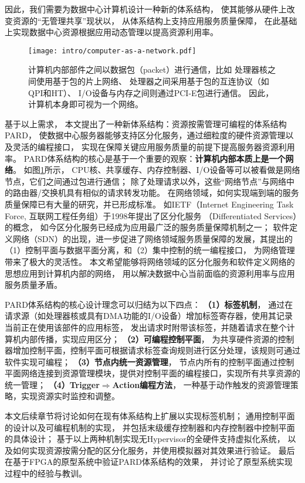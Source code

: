 因此，我们需要为数据中心计算机设计一种新的体系结构，
使其能够从硬件上改变资源的``无管理共享''现状以，
从体系结构上支持应用服务质量保障，
在此基础上实现数据中心资源根据应用动态管理以提高资源利用率。

\begin{figure}[H]
  \centering
  \texttt{[image: intro/computer-as-a-network.pdf]}
  \caption[计算机内部本质是一个网络]{
    计算机内部部件之间以数据包（packet）进行通信，比如
    处理器核之间使用基于包的片上网络、
    处理器之间采用基于包的互连协议（如QPI和HT）、
    I/O设备与内存之间则通过PCI-E包进行通信。
    因此，计算机本身即可视为一个网络。}
  \label{fig:computer-as-a-network}
\end{figure}

基于以上需求，
本文提出了一种新体系结构：资源按需管理可编程的体系结构PARD\cite{pard:2015}，
使数据中心服务器能够支持区分化服务，通过细粒度的硬件资源管理以及灵活的编程接口，
实现在保障关键应用服务质量的前提下提高服务器资源利用率。
PARD体系结构的核心是基于一个重要的观察：\textbf{计算机内部本质上是一个网络}。
如图\ref{fig:computer-as-a-network}所示，
CPU核、共享缓存、内存控制器、I/O设备等可以被看做是网络节点，它们之间通过包进行通信；
除了处理请求以外，这些``网络节点''与网络中的路由器/交换机具有相似的请求转发功能。
在网络领域，如何实现端到端的服务质量保障已有大量的研究，并已形成标准。
如IETF（Internet Engineering Task Force, 互联网工程任务组）于1998年提出了区分化服务
（Differentiated Services）\cite{DiffServ}的概念，
如今区分化服务已经成为应用最广泛的服务质量保障机制之一；
软件定义网络（SDN）\cite{SDN}的出现，进一步促进了网络领域服务质量保障的发展，其提出的
（1）控制平面与数据平面分离，和（2）集中控制的统一编程接口，
为网络管理带来了极大的灵活性。
本文希望能够将网络领域的区分化服务和软件定义网络的思想应用到计算机内部的网络，
用以解决数据中心当前面临的资源利用率与应用服务质量矛盾。

PARD体系结构的核心设计理念可以归结为以下四点：
\textbf{（1）标签机制}，
通过在请求源（如处理器核或具有DMA功能的I/O设备）增加标签寄存器，使用其记录当前正在使用该部件的应用标签，
发出请求时附带该标签，并随着请求在整个计算机内部传播，实现应用区分；
\textbf{（2）可编程控制平面}，
为共享硬件资源的控制器增加控制平面，控制平面可根据请求标签查询规则进行区分处理，该规则可通过软件实现可编程；
\textbf{（3）节点内统一资源管理}，
节点内所有的控制平面通过控制平面网络连接到资源管理模块，提供对控制平面的编程接口，实现所有共享资源的统一管理；
\textbf{（4）Trigger$\Rightarrow$Action编程方法}，
一种基于动作触发的资源管理策略，实现资源实时监控和调整。

本文后续章节将讨论如何在现有体系结构上扩展以实现标签机制；
通用控制平面的设计以及可编程机制的实现，
并包括末级缓存控制器和内存控制器中控制平面的具体设计；
基于以上两种机制实现无Hypervisor的全硬件支持虚拟化系统，
以及如何实现资源按需分配的区分化服务，并使用模拟器对其效果进行验证。
最后在基于FPGA的原型系统中验证PARD体系结构的效果，
并讨论了原型系统实现过程中的经验与教训。



